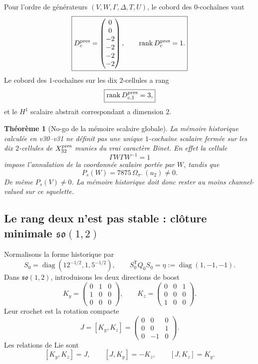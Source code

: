 \documentclass[11pt,a4paper]{article}
\newtheorem{theorem}{Théorème}[section]
\newcommand{\rank}{\operatorname{rank}}
\begin{document}
Pour l'ordre de générateurs $(V,W,\Gamma,\Delta,T,U)$, le cobord des $0$-cochaînes vaut
\begin{equation}\label{eq:v33-Dc}
 \boxed{
 D_c^{\rm pres}
 =
 \begin{pmatrix}
 0\\0\\-2\\-2\\-2\\-2
 \end{pmatrix},
 \qquad
 \rank D_c^{\rm pres}=1.}
\end{equation}
Le cobord des $1$-cochaînes sur les dix $2$-cellules a rang
\[
 \boxed{\rank D_{c,1}^{\rm pres}=3,}
\]
et le $H^1$ scalaire abstrait correspondant a dimension $2$.

\begin{theorem}[No-go de la mémoire scalaire globale]\label{thm:v33-scalar-memory-nogo}
La mémoire historique calculée en v30--v31 ne définit pas une unique $1$-cochaîne scalaire fermée
sur les dix $2$-cellules de $X_{32}^{\rm pres}$ munies du vrai caractère Binet. En effet la cellule
\[
 \Gamma W\Gamma W^{-1}=1
\]
impose l'annulation de la coordonnée scalaire portée par $W$, tandis que
\[
 P_s(W)=7875\,\Omega_{\sigma^-}(u_2)\neq0.
\]
De même $P_s(V)\neq0$. La mémoire historique doit donc rester au moins channel-valued sur ce
squelette.
\end{theorem}

\subsection{Le rang deux n'est pas stable : clôture minimale \texorpdfstring{$\mathfrak{so}(1,2)$}{so(1,2)}}

Normalisons la forme historique par
\[
 S_0=\operatorname{diag}(12^{-1/2},1,5^{-1/2}),
 \qquad
 S_0^{\mathsf T}Q_0S_0=\eta:=\operatorname{diag}(1,-1,-1).
\]
Dans $\mathfrak{so}(1,2)$, introduisons les deux directions de boost
\[
 K_y=
 \begin{pmatrix}0&1&0\\1&0&0\\0&0&0\end{pmatrix},
 \qquad
 K_z=
 \begin{pmatrix}0&0&1\\0&0&0\\1&0&0\end{pmatrix}.
\]
Leur crochet est la rotation compacte
\begin{equation}\label{eq:v33-Jphase}
 \boxed{
 J=[K_y,K_z]
 =
 \begin{pmatrix}0&0&0\\0&0&1\\0&-1&0\end{pmatrix}.}
\end{equation}
Les relations de Lie sont
\begin{equation}\label{eq:v33-so12-brackets}
 \boxed{
 [K_y,K_z]=J,
 \qquad[J,K_y]=-K_z,
 \qquad[J,K_z]=K_y.}
\end{equation}
\end{document}

